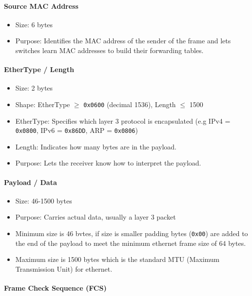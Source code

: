 \documentclass{article}
\begin{document}
\paragraph{Source MAC Address}

\begin{itemize}
    \item Size: 6 bytes
    \item Purpose: Identifies the MAC address of the sender of the frame and lets switches learn MAC addresses to build their forwarding tables.
\end{itemize}

\paragraph{EtherType / Length}

\begin{itemize}
    \item Size: 2 bytes
    \item Shape: EtherType $\geq$ \texttt{0x0600} (decimal 1536), Length $\leq$ 1500
    \item EtherType: Specifies which layer 3 protocol is encapsulated (e.g IPv4 = \texttt{0x0800}, IPv6 = \texttt{0x86DD}, ARP = \texttt{0x0806})
    \item Length: Indicates how many bytes are in the payload.
    \item Purpose: Lets the receiver know how to interpret the payload.
\end{itemize}

\paragraph{Payload / Data}

\begin{itemize}
    \item Size: 46-1500 bytes
    \item Purpose: Carries actual data, usually a layer 3 packet
    \item Minimum size is 46 bvtes, if size is smaller padding bytes (\texttt{0x00}) are added to the end of the payload to meet the minimum ethernet frame size of 64 bytes.
    \item Maximum size is 1500 bytes which is the standard MTU (Maximum Transmission Unit) for ethernet.
\end{itemize}

\paragraph{Frame Check Sequence (FCS)}
\end{document}
